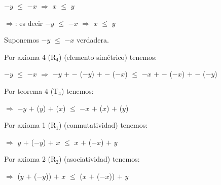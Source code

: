 \documentclass[12pt]{article}
\begin{document}
\begin{center}
{\LARGE{$-y$ $\leq$ $-x$ $\Longrightarrow$ $x$ $\leq$ $y$}}
\end{center} \vspace{0.5cm}

{} {\textcolor{pakistangreen}{{\Large{$\Longrightarrow$}}}}: es decir {\Large{$ -y $ $\leq$ $-x$ $\Longrightarrow$ $x$ $\leq$ $y$}} \vspace{0.5cm}

{} \vspace{0.5cm} 

Suponemos {\Large{$-y$ $\leq$ $-x$}} \hspace{0.2cm} {\textcolor{pakistangreen}{verdadera.}} \vspace{0.5cm}


{\textcolor{carrotorange}{Por axioma 4 (R$_4$)}} {({\textcolor{pakistangreen}{elemento simétrico}})} tenemos: \vspace{0.5cm}


\hspace{1.58cm} $-y$ $\leq$ $-x$ $\Longrightarrow$ $-y$ $+$ $-$ ($-y$) $+$ $-$ ($-x$) $\leq$ $-x$ $+$ $-$ ($-x$) $+$ $-$ ($-y$) 
 \vspace{0.5cm}


{\textcolor{carrotorange}{Por teorema 4 (T$_4$) }} tenemos: \vspace{0.5cm}

\begin{center}
 $\Longrightarrow$ $-y$ $+$ ($y$) $+$ ($x$) $\leq$ $-x$ $+$ ($x$) $+$ ($y$) 
\end{center} \vspace{0.5cm}  

{\textcolor{carrotorange}{Por axioma 1 (R$_1$) }} {({\textcolor{pakistangreen}{conmutatividad}})} tenemos: \vspace{0.5cm}

 
\hspace{3.8cm} $\Longrightarrow$ $y$ $+$ ($-y$) $+$ $x$ $\leq$ $x$ $+$ ($-x$)  $+$ $y$ 
 \vspace{0.5cm}  

{\textcolor{carrotorange}{Por axioma 2 (R$_2$) }} {({\textcolor{pakistangreen}{asociatividad}})} tenemos: \vspace{0.5cm}

\begin{center}
 $\Longrightarrow$ ($y$ $+$ ($-y$)) $+$ $x$ $\leq$ ($x$ $+$ ($-x$))  $+$ $y$ 
\end{center} \vspace{0.5cm}  
\end{document}
